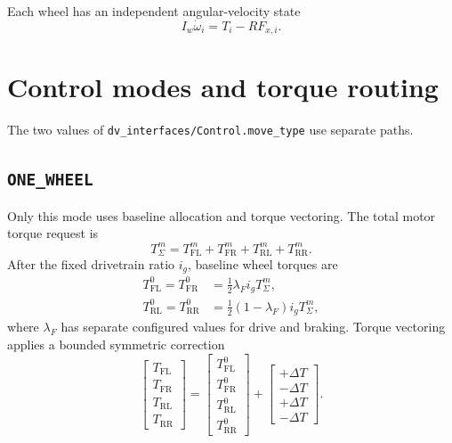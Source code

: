 \documentclass[11pt,a4paper]{article}
\begin{document}
Each wheel has an independent angular-velocity state
\begin{equation}
  I_w\dot\omega_i=T_i-RF_{x,i}.
\end{equation}

\section{Control modes and torque routing}

The two values of \texttt{dv\_interfaces/Control.move\_type} use separate
paths.

\subsection{\texttt{ONE\_WHEEL}}

Only this mode uses baseline allocation and torque vectoring. The total motor
torque request is
\begin{equation}
  T_{\Sigma}^{m} =
  T_{\mathrm{FL}}^{m}+T_{\mathrm{FR}}^{m}+
  T_{\mathrm{RL}}^{m}+T_{\mathrm{RR}}^{m}.
\end{equation}
After the fixed drivetrain ratio \(i_g\), baseline wheel torques are
\begin{align}
  T_{\mathrm{FL}}^{0}=T_{\mathrm{FR}}^{0}
    &=\frac{1}{2}\lambda_F i_gT_{\Sigma}^{m},\\
  T_{\mathrm{RL}}^{0}=T_{\mathrm{RR}}^{0}
    &=\frac{1}{2}(1-\lambda_F)i_gT_{\Sigma}^{m},
\end{align}
where \(\lambda_F\) has separate configured values for drive and braking.
Torque vectoring applies a bounded symmetric correction
\begin{equation}
  \begin{bmatrix}
  T_{\mathrm{FL}}\\T_{\mathrm{FR}}\\T_{\mathrm{RL}}\\T_{\mathrm{RR}}
  \end{bmatrix}
  =
  \begin{bmatrix}
  T_{\mathrm{FL}}^{0}\\T_{\mathrm{FR}}^{0}\\
  T_{\mathrm{RL}}^{0}\\T_{\mathrm{RR}}^{0}
  \end{bmatrix}
  +
  \begin{bmatrix}
  +\Delta T\\-\Delta T\\+\Delta T\\-\Delta T
  \end{bmatrix}.
\end{equation}
\end{document}
